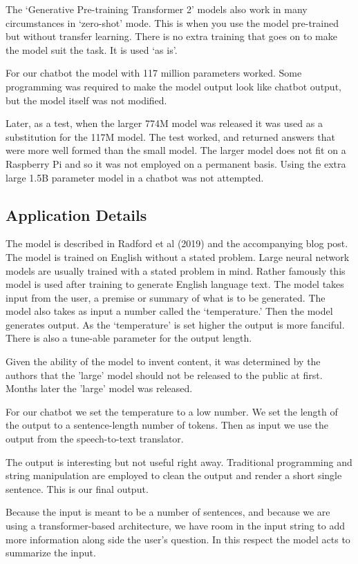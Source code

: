 The `Generative Pre-training Transformer 2' models also work in many circumstances in `zero-shot' mode. This is when you use the model pre-trained but without transfer learning. There is no extra training that goes on to make the model suit the task. It is used `as is'.

For our chatbot the model with 117 million parameters worked. Some programming was required to make the model output look like chatbot output, but the model itself was not modified.

Later, as a test, when the larger 774M model was released it was used as a substitution for the 117M model. The test worked, and returned answers that were more well formed than the small model. The larger model does not fit on a Raspberry Pi and so it was not employed on a permanent basis. Using the extra large 1.5B parameter model in a chatbot was not attempted.

\subsection*{Application Details}
The model is described in Radford et al (2019)\cite{radford2019language} and the accompanying blog post. The model is trained on English without a stated problem. Large neural network models are usually trained with a stated problem in mind. Rather famously this model is used after training to generate English language text. The model takes input from the user, a premise or summary of what is to be generated. The model also takes as input a number called the `temperature.' Then the model generates output. As the `temperature' is set higher the output is more fanciful. There is also a tune-able parameter for the output length. 

Given the ability of the model to invent content, it was determined by the authors that the 'large' model should not be released to the public at first. Months later the 'large' model was released. 

For our chatbot we set the temperature to a low number. We set the length of the output to a sentence-length number of tokens. Then as input we use the output from the speech-to-text translator.

The output is interesting but not useful right away. Traditional programming and string manipulation are employed to clean the output and render a short single sentence. This is our final output.

Because the input is meant to be a number of sentences, and because we are using a transformer-based architecture, we have room in the input string to add more information along side the user's question. In this respect the model acts to summarize the input. 

